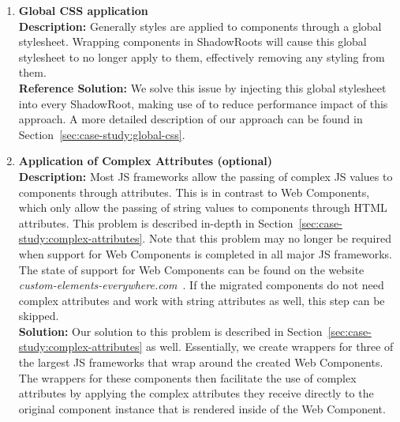 \begin{enumerate}
	\item \textbf{Global CSS application} \\
	      \textbf{Description:} Generally styles are applied to components through a global stylesheet. Wrapping components in ShadowRoots will cause this global stylesheet to no longer apply to them, effectively removing any styling from them. \\
	      \textbf{Reference Solution:} We solve this issue by injecting this global stylesheet into every ShadowRoot, making use of  to reduce performance impact of this approach. A more detailed description of our approach can be found in Section~\ref{sec:case-study:global-css}.
	\item \textbf{Application of Complex Attributes (optional)} \\
	      \textbf{Description:} Most JS frameworks allow the passing of complex JS values to components through attributes. This is in contrast to Web Components, which only allow the passing of string values to components through HTML attributes. This problem is described in-depth in Section~\ref{sec:case-study:complex-attributes}. Note that this problem may no longer be required when support for Web Components is completed in all major JS frameworks. The state of support for Web Components can be found on the website \emph{custom-elements-everywhere.com}~. If the migrated components do not need complex attributes and work with string attributes as well, this step can be skipped. \\
	      \textbf{Solution:} Our solution to this problem is described in Section~\ref{sec:case-study:complex-attributes} as well. Essentially, we create wrappers for three of the largest JS frameworks that wrap around the created Web Components. The wrappers for these components then facilitate the use of complex attributes by applying the complex attributes they receive directly to the original component instance that is rendered inside of the Web Component.
\end{enumerate}